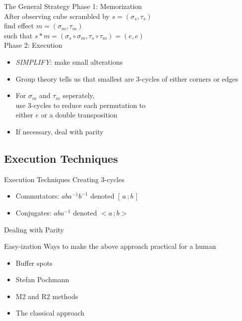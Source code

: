 \documentclass{beamer}
\begin{document}
				\begin{frame}{The General Strategy}
					Phase 1: Memorization \\[.1cm]
					\quad \quad After observing cube scrambled by \( s = (\sigma_s,\tau_s) \)  \\
					\quad \quad find effect \( m = (\sigma_m,\tau_m) \) \\ 
					\quad \quad such that \( s * m = (\sigma_s \circ \sigma_m, \tau_s \circ \tau_m) = (e,e) \) \\[.5cm]
				\pause
					Phase 2: Execution \\
					\begin{itemize}
						\item \emph{SIMPLIFY}: make small alterations\\
						\item Group theory tells us that smallest are 3-cycles of either corners or edges\\
						\item For \( \sigma_m \) and \( \tau_m \) seperately, \\
							use 3-cycles to reduce each permutation to \\ 
							either \(e\) or a double transposition
						\item If necessary, deal with parity \\[.3cm]
					\end{itemize}
				\end{frame}

			\subsection{Execution Techniques}
		
				\begin{frame}{Execution Techniques}
					Creating 3-cycles \\[.2cm]
					\begin{itemize}
						\item Commutators: \quad \( aba^{-1}b^{-1} \) \quad denoted \( [\,a\,;b\,]\)
						\item Conjugates: \quad \( aba^{-1} \) \quad denoted \( <a\,;b> \) \\[.7cm]
					\end{itemize}
					Dealing with Parity
				\end{frame}

				\begin{frame}{Easy-ization}
					Ways to make the above approach practical for a human \\[.2cm]
					\begin{itemize}
						\item Buffer spots
						\item Stefan Pochmann
						\item M2 and R2 methods
						\item The classical approach
					\end{itemize}
				\end{frame}
		
\end{document}
